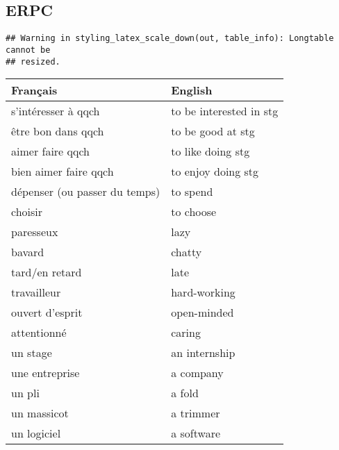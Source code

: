 \documentclass[
  10pt,
]{article}
\begin{document}
\hypertarget{erpc}{%
\subsection{ERPC}\label{erpc}}

\begin{verbatim}
## Warning in styling_latex_scale_down(out, table_info): Longtable cannot be
## resized.
\end{verbatim}

\begin{longtable}{ll}
\toprule
Français &  English\\
\midrule
\rowcolor{gray!6}  s'intéresser à qqch & to be interested in stg\\

être bon dans qqch & to be good  at stg\\

\rowcolor{gray!6}  aimer faire qqch & to like doing stg\\

bien aimer faire qqch & to enjoy doing stg\\

\rowcolor{gray!6}  dépenser (ou passer du temps) & to spend\\

choisir & to choose\\

\rowcolor{gray!6}  paresseux & lazy\\

bavard & chatty\\

\rowcolor{gray!6}  tard/en retard & late\\

travailleur & hard-working\\

\rowcolor{gray!6}  ouvert d'esprit & open-minded\\

attentionné & caring\\

\rowcolor{gray!6}  un stage & an internship\\

une entreprise & a company\\

\rowcolor{gray!6}  un pli & a fold\\

un massicot & a trimmer\\

\rowcolor{gray!6}  un logiciel & a software\\


\end{longtable}
\end{document}
